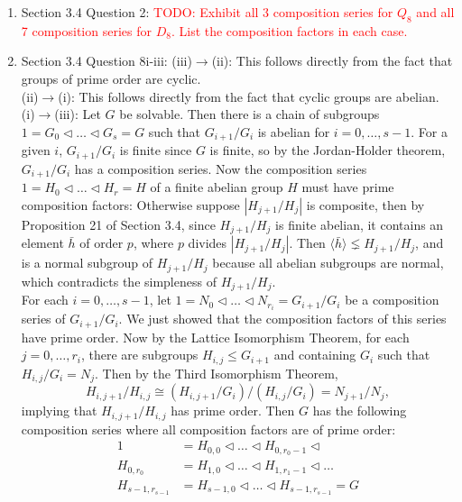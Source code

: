 \documentclass{article}
\newcommand{\TODO}[1]{\textcolor{red}{TODO: #1}}
\begin{document}
\begin{enumerate}
  \item Section 3.4 Question 2: \TODO{Exhibit all 3 composition series for
    $Q_8$ and all 7 composition series for $D_8$. List the composition
    factors in each case.}

  \item Section 3.4 Question 8i-iii: (iii)$\rightarrow$(ii): This follows
    directly from the fact that groups of prime order are cyclic. \\

    (ii)$\rightarrow$(i): This follows directly from the fact that cyclic
    groups are abelian. \\

    (i)$\rightarrow$(iii): Let $G$ be solvable. Then there is a chain of
    subgroups $1=G_0\triangleleft\ldots\triangleleft G_s=G$ such that
    $G_{i+1}/G_i$ is abelian for $i=0,\ldots,s-1$. For a given $i$,
    $G_{i+1}/G_i$ is finite since $G$ is finite, so by the Jordan-Holder
    theorem, $G_{i+1}/G_i$ has a composition series. Now the composition
    series $1=H_0\triangleleft\ldots\triangleleft H_r=H$ of a finite
    abelian group $H$ must have prime composition factors: Otherwise
    suppose $|H_{j+1}/H_j|$ is composite, then by Proposition 21 of Section
    3.4, since $H_{j+1}/H_j$ is finite abelian, it contains an element
    $\bar{h}$ of order $p$, where $p$ divides $|H_{j+1}/H_j|$. Then
    $\langle\bar{h}\rangle\lneq H_{j+1}/H_j$, and is a normal subgroup of
    $H_{j+1}/H_j$ because all abelian subgroups are normal, which
    contradicts the simpleness of $H_{j+1}/H_j$. \\

    For each $i=0,\ldots,s-1$, let $1=N_0\triangleleft\ldots\triangleleft
    N_{r_i}=G_{i+1}/G_i$ be a composition series of $G_{i+1}/G_i$. We just
    showed that the composition factors of this series have prime order.
    Now by the Lattice Isomorphism Theorem, for each $j=0,\ldots,r_i$,
    there are subgroups $H_{i,j}\leq G_{i+1}$ and containing $G_i$ such that
    $H_{i,j}/G_i=N_j$. Then by the Third Isomorphism Theorem,
    \begin{equation*}
      H_{i,j+1}/H_{i,j} \cong (H_{i,j+1}/G_i)/(H_{i,j}/G_i) = N_{j+1}/N_j,
    \end{equation*}
    implying that $H_{i,j+1}/H_{i,j}$ has prime order. Then $G$ has the
    following composition series where all composition factors are of prime
    order:
    \begin{align*}
      1         &=H_{0,0}\triangleleft\ldots\triangleleft
                  H_{0,r_0-1}\triangleleft  \\
      H_{0,r_0} &=H_{1,0}\triangleleft\ldots\triangleleft
                  H_{1,r_1-1}\triangleleft\ldots  \\
      H_{s-1,r_{s-1}} &=H_{s-1,0}\triangleleft\ldots\triangleleft
                  H_{s-1,r_{s-1}}=G \\
    \end{align*}
\end{enumerate}
\end{document}
